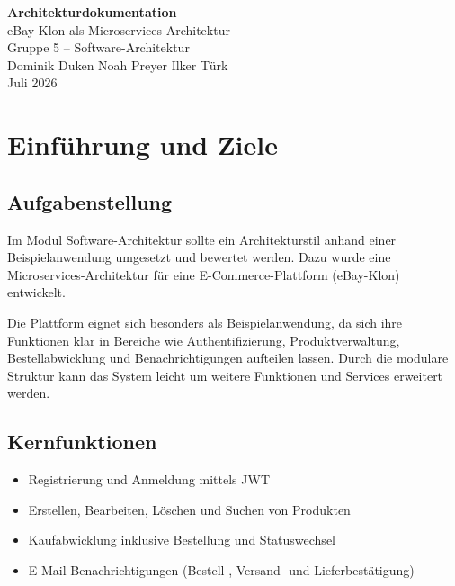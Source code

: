 \documentclass[11pt,a4paper]{article}
\begin{document}
\begin{titlepage}
\centering
\vspace*{\fill}
{\Huge\bfseries Architekturdokumentation}\\[8pt]
{\LARGE eBay-Klon als Microservices-Architektur}\\[20pt]
{\large Gruppe 5 -- Software-Architektur}\\[12pt]
Dominik Duken \quad Noah Preyer \quad Ilker T\"urk\\[8pt]
Juli 2026
\vspace*{\fill}
\end{titlepage}

\tableofcontents
\newpage

\section{Einf\"uhrung und Ziele}

\subsection{Aufgabenstellung}

Im Modul Software-Architektur sollte ein Architekturstil anhand einer
Beispielanwendung umgesetzt und bewertet werden. Dazu wurde eine
Microservices-Architektur f\"ur eine E-Commerce-Plattform (eBay-Klon)
entwickelt.

Die Plattform eignet sich besonders als Beispielanwendung, da sich ihre
Funktionen klar in Bereiche wie Authentifizierung, Produktverwaltung,
Bestellabwicklung und Benachrichtigungen aufteilen lassen. Durch die
modulare Struktur kann das System leicht um weitere Funktionen und
Services erweitert werden.

\subsection{Kernfunktionen}

\begin{itemize}[leftmargin=1.5em, itemsep=2pt]
  \item Registrierung und Anmeldung mittels JWT
  \item Erstellen, Bearbeiten, L\"oschen und Suchen von Produkten
  \item Kaufabwicklung inklusive Bestellung und Statuswechsel
  \item E-Mail-Benachrichtigungen (Bestell-, Versand- und
        Lieferbest\"atigung)
\end{itemize}
\end{document}
